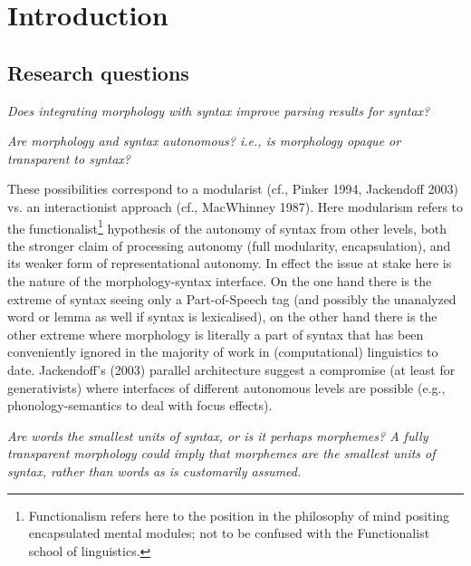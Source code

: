 \documentclass[10pt,a4paper]{article}
\begin{document}
\newpage

\tableofcontents


\section{Introduction}
\subsection{Research questions}

\noindent
\emph{
Does integrating morphology with syntax improve parsing results for
syntax?}

\noindent
\emph{
Are morphology and syntax autonomous? i.e., is morphology opaque or
transparent to syntax?
}

These possibilities correspond to a modularist (cf., Pinker 1994, Jackendoff
2003) vs. an interactionist approach (cf., MacWhinney 1987). Here modularism
refers to the functionalist\footnote{Functionalism refers here to the position
in the philosophy of mind positing encapsulated mental modules; not to be
confused with the Functionalist school of linguistics.} hypothesis of the
autonomy of syntax from other levels, both the stronger claim of processing
autonomy (full modularity, encapsulation), and its weaker form of
representational autonomy. In effect the issue at stake here is the nature of
the morphology-syntax interface. On the one hand there is the extreme of syntax
seeing only a Part-of-Speech tag (and possibly the unanalyzed word or lemma as
well if syntax is lexicalised), on the other hand there is the other extreme
where morphology is literally a part of syntax that has been conveniently
ignored in the majority of work in (computational) linguistics to date.
Jackendoff's (2003) parallel architecture suggest a compromise (at least for
generativists) where interfaces of different autonomous levels are possible
(e.g., phonology-semantics to deal with focus effects).

\noindent
\emph{
Are words the smallest units of syntax, or is it perhaps morphemes? A
fully transparent morphology could imply that morphemes are the smallest units
of syntax, rather than words as is customarily assumed.
}
\end{document}
